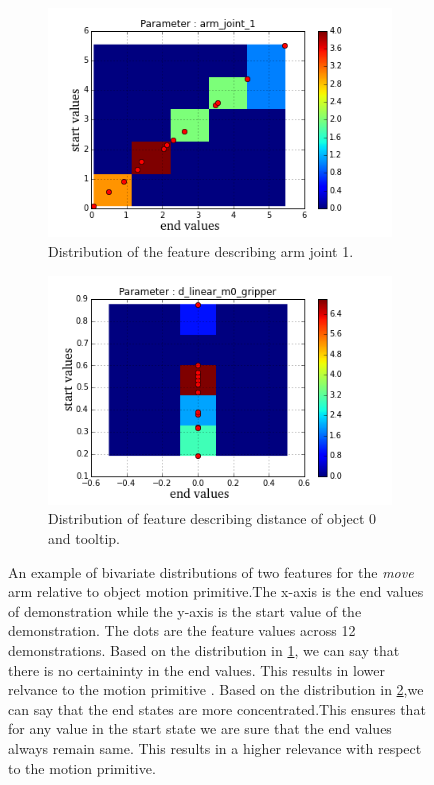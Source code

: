 \begin{figure}
    \centering
    \begin{subfigure}[b]{0.4\textwidth}
        \includegraphics[scale=0.5]{images/arm_joint_1JoinPDF.png} 
        \caption{Distribution of the feature describing arm joint 1.}
        \label{sub fig 1}
    \end{subfigure}
    \begin{subfigure}[b]{0.4\textwidth}
        \includegraphics[scale=0.5]{images/d_linear_m0_gripperJoinPDF.png} 
        \caption{Distribution of feature describing distance of object 0 and tooltip. }
        \label{sub fig 2}
    \end{subfigure}
    \caption[Bivariate distribution of features]{An example of bivariate
        distributions of two features for the \textit{move} arm relative to object motion
        primitive.The x-axis is the end values of demonstration while the 
        y-axis is the start value of the demonstration. The dots are the 
        feature values across 12 demonstrations.
        Based on the distribution in \ref{sub fig 1}, we can say that
        there is no certaininty in the end values. This 
        results in lower relvance to the motion primitive . Based on the
        distribution in \ref{sub fig 2},we can say that the end states are
        more concentrated.This ensures that for any value in the start state
        we are sure that the end values always remain same.
        This results in a higher relevance with respect to the motion
    primitive.}\label{fig:feature distribution}
\end{figure}


